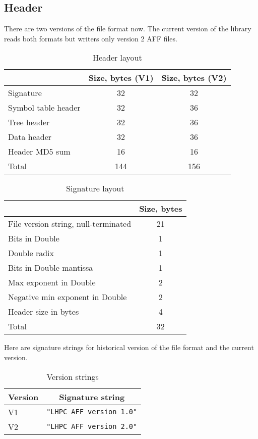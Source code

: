 \documentclass[10pt,letterpaper]{article}
\newcommand{\bc}{\begin{center}}
\newcommand{\ec}{\end{center}}
\begin{document}
\subsection{Header}
There are two versions of the file format now. The current version of the
library reads both formats but writers only version 2 AFF files.
\begin{table}[h]
\bc
\caption{Header layout}\label{tab:header}
\begin{tabular}{|l|c|c|} \hline
 & Size, bytes (V1) & Size, bytes (V2)\\ \hline\hline
Signature & 32 & 32 \\ \hline
Symbol table header & 32 & 36 \\ \hline
Tree header & 32 & 36 \\ \hline
Data header & 32 & 36 \\ \hline
Header MD5 sum & 16 & 16 \\ \hline\hline
Total & 144 & 156 \\ \hline
\end{tabular}
\ec
\end{table}

\begin{table}[h]
\bc
\caption{Signature layout}\label{tab:signature}
\begin{tabular}{|l|c|} \hline
 & Size, bytes \\ \hline\hline
File version string, null-terminated &  21\\ \hline
Bits in Double & 1 \\ \hline
Double radix & 1 \\ \hline
Bits in Double mantissa & 1 \\ \hline
Max exponent in Double & 2 \\ \hline
Negative min exponent in Double & 2 \\ \hline
Header size in bytes & 4 \\ \hline\hline
Total & 32 \\ \hline
\end{tabular}
\ec
\end{table}
Here are signature strings for historical version of the file format and the
current version.
\begin{table}[h]
\bc
\caption{Version strings}\label{tab:versions}
\begin{tabular}{|l|c|} \hline
 Version & Signature string \\ \hline\hline
 V1 & \verb|"LHPC AFF version 1.0"| \\ \hline
 V2 & \verb|"LHPC AFF version 2.0"| \\ \hline
\end{tabular}
\ec
\end{table}
\end{document}
